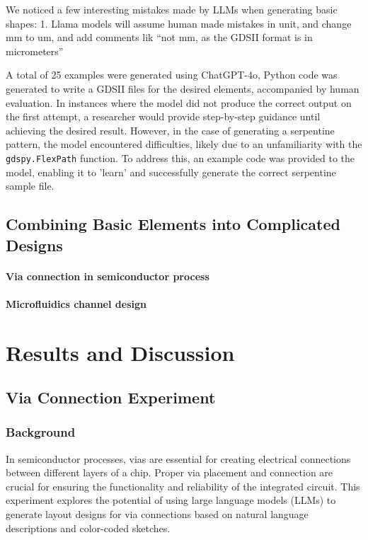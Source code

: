 \documentclass{article}
\begin{document}
We noticed a few interesting mistakes made by LLMs when generating basic shapes:
1. Llama models will assume human made mistakes in unit, and change mm to um, and add comments lik ``not mm, as the GDSII format is in micrometers''

A total of 25 examples were generated using ChatGPT-4o, Python code was generated to write a GDSII files for the desired elements, accompanied by human evaluation. In instances where the model did not produce the correct output on the first attempt, a researcher would provide step-by-step guidance until achieving the desired result. However, in the case of generating a serpentine pattern, the model encountered difficulties, likely due to an unfamiliarity with the \texttt{gdspy.FlexPath} function. To address this, an example code was provided to the model, enabling it to 'learn' and successfully generate the correct serpentine sample file.

\subsection{Combining Basic Elements into Complicated Designs}
\paragraph{Via connection in semiconductor process}
\paragraph{Microfluidics channel design}


\section{Results and Discussion}
\subsection{Via Connection Experiment}
\subsubsection{Background}
In semiconductor processes, vias are essential for creating electrical connections between different layers of a chip. Proper via placement and connection are crucial for ensuring the functionality and reliability of the integrated circuit. This experiment explores the potential of using large language models (LLMs) to generate layout designs for via connections based on natural language descriptions and color-coded sketches.
\end{document}

